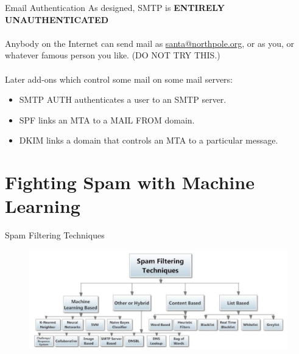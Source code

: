 \documentclass[nobackground,dvipsnames,table,aspectratio=169]{beamer}
\begin{document}
\begin{frame}{Email Authentication}
    As designed, SMTP is \textbf{ENTIRELY UNAUTHENTICATED}\\~\\
    Anybody on the Internet can send mail as \url{santa@northpole.org}, or as you, or whatever famous person you like. (DO NOT TRY THIS.)\\~\\
    
    Later add-ons which control some mail on some mail servers:
    \begin{itemize}
        \item SMTP AUTH authenticates a user to an SMTP server.
        \item SPF links an MTA to a MAIL FROM domain.
        \item DKIM links a domain that controls an MTA to a particular message.
    \end{itemize}
\end{frame}

\section{Fighting Spam with Machine Learning}

\begin{frame}{Spam Filtering Techniques}
    \begin{figure}
        \centering
        \includegraphics[width=\textwidth]{spam-filtering-techniques}
    \end{figure}
\end{frame}
\end{document}

